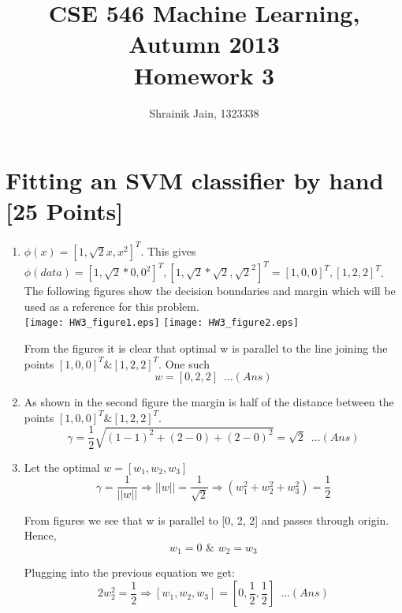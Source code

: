 \documentclass[letterpaper]{article}
\title{CSE 546 Machine Learning, Autumn 2013 \\ Homework 3}
\date{Shrainik Jain, 1323338}
\begin{document}
	
	\maketitle
	
	
	\section{Fitting an SVM classifier by hand [25 Points]}
	\begin{enumerate}
		\item $\phi(x) = [1, \sqrt{2}x,x^2]^T$. This gives $\phi(data) = [1, \sqrt{2}*0, 0^2]^T , [1, \sqrt{2}*\sqrt{2}, \sqrt{2}^2]^T = [1, 0, 0]^T, [1, 2, 2]^T$. The following figures show the decision boundaries and margin which will be used as a reference for this problem.\\
		\texttt{[image: HW3\_figure1.eps]}
		\texttt{[image: HW3\_figure2.eps]}
		
		From the figures it is clear that optimal w is parallel to the line joining the points $[1, 0, 0]^T  \&  [1, 2, 2]^T$. One such
		\begin{equation}
			w = [0, 2, 2] \,\,\, ...(Ans)
		\end{equation}
		
		\item As shown in the second figure the margin is half of the distance between the points $[1, 0, 0]^T  \&  [1, 2, 2]^T$.
		\begin{equation}
			\gamma = \frac{1}{2}\sqrt{(1-1)^2 + (2-0) + (2-0)^2} = \sqrt{2} \,\,\, ...(Ans)
		\end{equation}
		
		\item 
		Let the optimal $w = [w_1, w_2, w_3]$
		\begin{equation}
			\gamma = \frac{1}{||w||} \Rightarrow ||w|| = \frac{1}{\sqrt{2}} \Rightarrow (w_1^2 + w_2^2 + w_3^2) = \frac{1}{2}
		\end{equation}
		
		From figures we see that w is parallel to [0, 2, 2] and passes through origin. Hence,
		\begin{equation}
			w_1 = 0 \,\, \& \,\,w_2 = w_3
		\end{equation}
		
		Plugging into the previous equation we get:
		\begin{equation}
			2w_2^2 = \frac{1}{2} \Rightarrow  [w_1, w_2, w_3] = [0, \frac{1}{2}, \frac{1}{2}] \,\,\, ...(Ans)
		\end{equation}
		

\end{enumerate}
\end{document}
